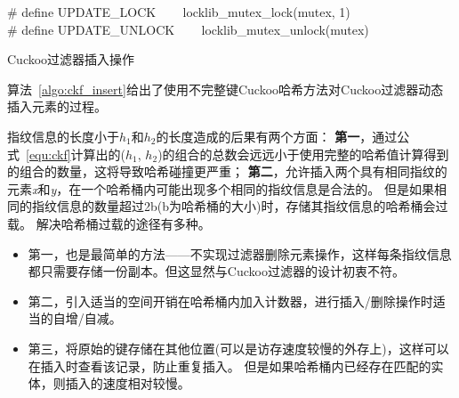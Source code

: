 \begin{algorithm}[htbp]
\SetAlgoLined
\# define UPDATE\_LOCK ~~~ locklib\_mutex\_lock(mutex, 1)\\
\# define UPDATE\_UNLOCK ~~~ locklib\_mutex\_unlock(mutex)\\
\caption{Cuckoo过滤器插入操作}
\label{algo:ckf_insert}
\end{algorithm}

算法~\ref{algo:ckf_insert}给出了使用不完整键Cuckoo哈希方法对Cuckoo过滤器动态插入元素的过程。

指纹信息的长度小于$h_1$和$h_2$的长度造成的后果有两个方面：
\textbf{第一}，通过公式~\ref{equ:ckf}计算出的($h_1$, $h_2$)的组合的总数会远远小于使用完整的哈希值计算得到的组合的数量，这将导致哈希碰撞更严重；
\textbf{第二}，允许插入两个具有相同指纹的元素\textit{x}和\textit{y}，在一个哈希桶内可能出现多个相同的指纹信息是合法的。
但是如果相同的指纹信息的数量超过2b(b为哈希桶的大小)时，存储其指纹信息的哈希桶会过载。
解决哈希桶过载的途径有多种。
\begin{itemize}
	\item 第一，也是最简单的方法——不实现过滤器删除元素操作，这样每条指纹信息都只需要存储一份副本。但这显然与Cuckoo过滤器的设计初衷不符。
	\item 第二，引入适当的空间开销在哈希桶内加入计数器，进行插入/删除操作时适当的自增/自减。
	\item 第三，将原始的键存储在其他位置(可以是访存速度较慢的外存上)，这样可以在插入时查看该记录，防止重复插入。
	但是如果哈希桶内已经存在匹配的实体，则插入的速度相对较慢。
\end{itemize}	

